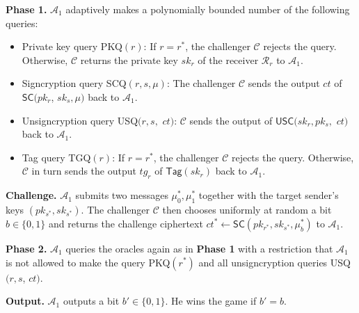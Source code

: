 \documentclass[a4paper,11pt,onecolumn]{elsarticle}
\begin{document}
	 \textbf{Phase 1.}  $\mathcal{A}_1$ adaptively makes a polynomially bounded number of the following queries:
				\begin{itemize}
					\item Private key query  PKQ$(r)$: If $r=r^*$, the challenger $\mathcal{C}$ rejects the query. Otherwise, $\mathcal{C}$ returns the private key $sk_{r}$ of the receiver $\mathcal{R}_{r}$  to $\mathcal{A}_1$. 
					\item Signcryption query SCQ$(r,s,\mu)$: The challenger $\mathcal{C}$ sends the output $ct$ of $\textsf{SC}(pk_{r}$, $sk_{s},\mu)$ back to $\mathcal{A}_1$.
					\item Unsigncryption query   USQ$(r,s,$ $ct)$: $\mathcal{C}$ sends the output of $\textsf{USC}(sk_{r},pk_{s},$ $ct)$ back to $\mathcal{A}_1$.
					\item Tag query TGQ$(r)$: If $r=r^*$, the challenger $\mathcal{C}$ rejects the query. Otherwise, $\mathcal{C}$ in turn sends the output $tg_{r}$ of $\textsf{Tag}(sk_{r})$ back to $\mathcal{A}_1$.
				\end{itemize}
				
		\textbf{Challenge.} $\mathcal{A}_1$ submits two messages $\mu^*_0, \mu^*_1$ together with the target sender's keys $(pk_{s^*}, sk_{s^*})$. The challenger $\mathcal{C}$ then chooses uniformly at random a bit $b \in \{0,1\}$ and returns the challenge ciphertext $ct^* \leftarrow \mathsf{SC}(pk_{r^*}, sk_{s^*},\mu^*_b)$ to $\mathcal{A}_1$.
		
	 \textbf{Phase 2.} $\mathcal{A}_1$ queries the oracles again as in \textbf{Phase 1} with a restriction that $\mathcal{A}_1$ is not allowed to make the query PKQ$(r^*)$ and all unsigncryption queries USQ$(r,s$, $ct)$.
			
		 \textbf{Output.} $\mathcal{A}_1$  outputs a bit $b' \in \{0,1\}$. He wins the game if $b'=b$.
			
			
			
			\iffalse
			
\end{document}
